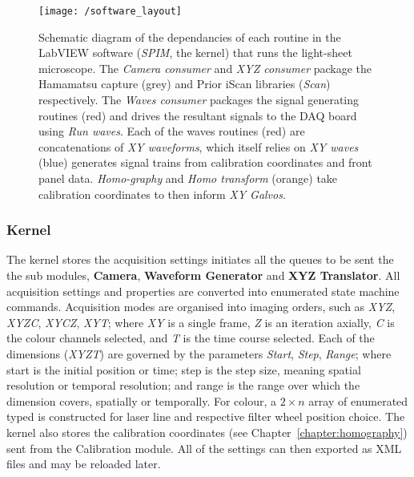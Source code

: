 

\begin{figure}
    \centering
    \texttt{[image: /software\_layout]}
    \caption{Schematic diagram of the dependancies of each routine in the LabVIEW software (\emph{SPIM}, the kernel) that runs the light-sheet microscope.
    The \emph{Camera consumer} and \emph{XYZ consumer} package the Hamamatsu capture (grey) and Prior iScan libraries (\emph{Scan}) respectively.
    The \emph{Waves consumer} packages the signal generating routines (red) and drives the resultant signals to the DAQ board using \emph{Run waves}.
    Each of the waves routines (red) are concatenations of \emph{XY waveforms}, which itself relies on \emph{XY waves} (blue) generates signal trains from calibration coordinates and front panel data.
    \emph{Homo-graphy} and \emph{Homo transform} (orange) take calibration coordinates to then inform \emph{XY Galvos}.
    }\label{fig:software_layout}
\end{figure}

\subsubsection{Kernel}

The kernel stores  the acquisition settings initiates all the queues to be sent the the sub modules, \textbf{Camera}, \textbf{Waveform Generator} and \textbf{XYZ Translator}.
All acquisition settings and properties are converted into enumerated state machine commands.
Acquisition modes are organised into imaging orders, such as \emph{XYZ}, \emph{XYZC}, \emph{XYCZ}, \emph{XYT}; where \emph{XY} is a single frame, \emph{Z} is an iteration axially, \emph{C} is the colour channels selected, and \emph{T} is the time course selected.
Each of the dimensions (\emph{XYZT}) are governed by the parameters \emph{Start}, \emph{Step}, \emph{Range}; where start is the initial position or time; step is the step size, meaning spatial resolution or temporal resolution; and range is the range over which the dimension covers, spatially or temporally.
For colour, a \(2\times n\) array of enumerated typed is constructed for laser line and respective filter wheel position choice.
The kernel also stores the calibration coordinates (see Chapter~\ref{chapter:homography}) sent from the Calibration module.
All of the
settings can then exported as XML files and may be reloaded later.


